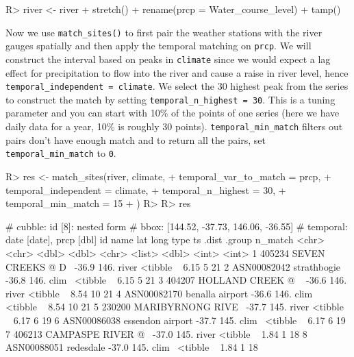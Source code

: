 \documentclass[
]{jss}
\begin{document}
\begin{CodeChunk}
\begin{CodeInput}
R> river <- river %
+   stretch() %
+   rename(prcp = Water_course_level) %
+   tamp()
\end{CodeInput}
\end{CodeChunk}

Now we use \texttt{match\_sites()} to first pair the weather stations
with the river gauges spatially and then apply the temporal matching on
\texttt{prcp}. We will construct the interval based on peaks in
\texttt{climate} since we would expect a lag effect for precipitation to
flow into the river and cause a raise in river level, hence
\texttt{temporal\_independent\ =\ climate}. We select the 30 highest
peak from the series to construct the match by setting
\texttt{temporal\_n\_highest\ =\ 30}. This is a tuning parameter and you
can start with 10\% of the points of one series (here we have daily data
for a year, 10\% is roughly 30 points). \texttt{temporal\_min\_match}
filters out pairs don't have enough match and to return all the pairs,
set \texttt{temporal\_min\_match} to \texttt{0}.

\begin{CodeChunk}
\begin{CodeInput}
R> res <- match_sites(river, climate,
+   temporal_var_to_match = prcp,
+   temporal_independent = climate,  
+   temporal_n_highest = 30,
+   temporal_min_match = 15
+ )
R> 
R> res
\end{CodeInput}
\begin{CodeOutput}
# cubble:   id [8]: nested form
# bbox:     [144.52, -37.73, 146.06, -36.55]
# temporal: date [date], prcp [dbl]
  id          name                lat  long type  ts        .dist .group n_match
  <chr>       <chr>             <dbl> <dbl> <chr> <list>    <dbl>  <int>   <int>
1 405234      SEVEN CREEKS @ D~ -36.9  146. river <tibble ~  6.15      5      21
2 ASN00082042 strathbogie       -36.8  146. clim~ <tibble ~  6.15      5      21
3 404207      HOLLAND CREEK @ ~ -36.6  146. river <tibble ~  8.54     10      21
4 ASN00082170 benalla airport   -36.6  146. clim~ <tibble ~  8.54     10      21
5 230200      MARIBYRNONG RIVE~ -37.7  145. river <tibble ~  6.17      6      19
6 ASN00086038 essendon airport  -37.7  145. clim~ <tibble ~  6.17      6      19
7 406213      CAMPASPE RIVER @~ -37.0  145. river <tibble ~  1.84      1      18
8 ASN00088051 redesdale         -37.0  145. clim~ <tibble ~  1.84      1      18
\end{CodeOutput}
\end{CodeChunk}
\end{document}
